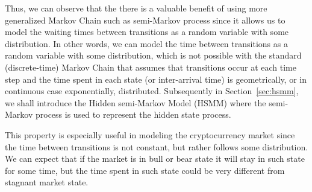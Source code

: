 Thus, we can observe that the there is a valuable benefit of using more generalized Markov Chain such as semi-Markov process since it allows us to model the waiting times between transitions
as a random variable with some distribution. In other words, we can model the time between transitions as a random variable with some distribution, which is not possible with the standard (discrete-time) Markov Chain that
assumes that transitions occur at each time step and the time spent in each state (or inter-arrival time) is geometrically, or in continuous case exponentially, distributed. Subsequently in Section~\ref{sec:hsmm}, we shall introduce the Hidden semi-Markov Model (HSMM) 
where the semi-Markov process is used to represent the hidden state process.

This property is especially useful in modeling the cryptocurrency market since the time between transitions is not constant, but rather follows some distribution. We can expect that 
if the market is in bull or bear state it will stay in such state for some time, but the time spent in such state could be very different from stagnant market state.
